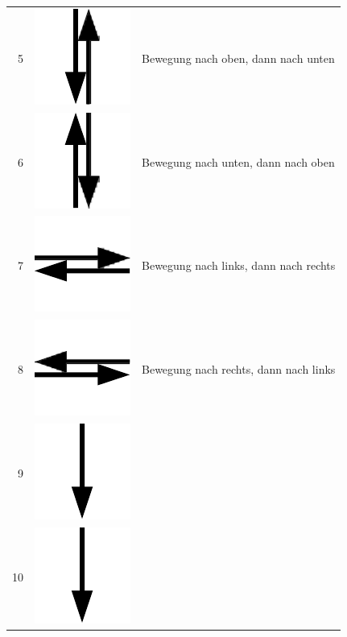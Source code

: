 \documentclass[11pt,a4paper,notitlepage]{article}
\begin{document}
\begin{center}
\begin{supertabular}{rcl}
  5 & \includegraphics[scale=0.25]{img/up-down} & Bewegung nach oben, dann nach unten \\
  6 & \includegraphics[scale=0.25]{img/down-up} & Bewegung nach unten, dann nach oben \\
  7 & \includegraphics[scale=0.25]{img/left-right} & Bewegung nach links, dann nach rechts \\
  8 & \includegraphics[scale=0.25]{img/right-left} & Bewegung nach rechts, dann nach links \\
  9 & \includegraphics[scale=0.25]{img/down} & \\
 10 & \includegraphics[scale=0.25]{img/down} & \\
\end{supertabular}
\end{center}
\end{document}
